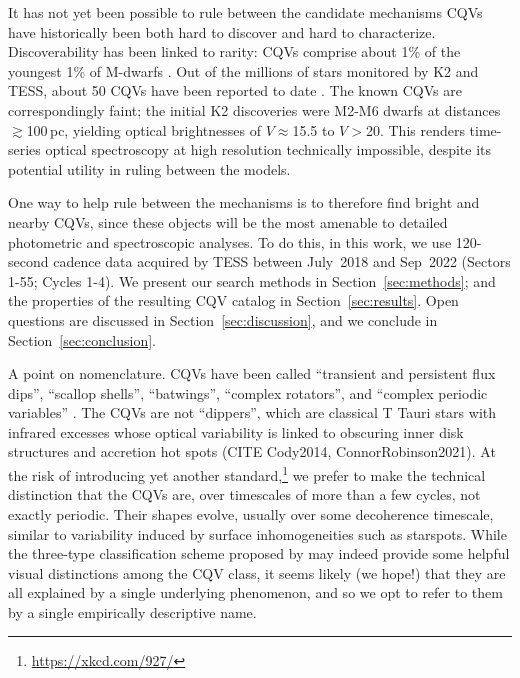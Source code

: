 \documentclass[11pt,twocolumn,tighten]{aastex63}
\begin{document}
It has not yet been possible to rule between the candidate mechanisms
CQVs have historically been both hard to discover and hard
to characterize.   Discoverability has been linked to rarity: 
CQVs comprise about 1\% of the youngest 1\% of M-dwarfs
\citep{2018AJ....155..196R}.  Out of the millions of stars monitored
by K2 and TESS, about 50 CQVs have been reported to date
\citep{2017AJ....153..152S,2018AJ....155...63S,2019ApJ...876..127Z,2022AJ....163..144G,2023ApJ...945..114P}.
The known CQVs are correspondingly faint; the initial K2 discoveries
\citep{2017AJ....153..152S} were M2-M6 dwarfs at distances
$\gtrsim$100\,pc, yielding optical brightnesses of $V$$\approx$15.5 to
$V$$>$20.  This renders time-series optical spectroscopy at high
resolution technically impossible, despite its potential utility in
ruling between the models.

One way to help rule between the mechanisms is to therefore find
bright and nearby CQVs, since these objects will be the most amenable
to detailed photometric and spectroscopic analyses.  To do this, in
this work, we use 120-second cadence data acquired by TESS between July~2018 and Sep~2022 (Sectors
1-55; Cycles 1-4).  We present our search methods in
Section~\ref{sec:methods}; and the properties of the resulting CQV
catalog in Section~\ref{sec:results}.  Open questions are discussed in
Section~\ref{sec:discussion}, and we conclude in
Section~\ref{sec:conclusion}.

A point on nomenclature.  CQVs have been called ``transient and
persistent flux dips'', ``scallop shells'', ``batwings'',
\citep{2017AJ....153..152S,2018AJ....155...63S} ``complex rotators'',
\citep{2019ApJ...876..127Z,2022AJ....163..144G,2023ApJ...945..114P}
and ``complex periodic variables'' \citep{2023MNRAS.518.2921K}.  The
CQVs are not ``dippers'', which are classical T Tauri stars with
infrared excesses whose optical variability is linked to obscuring
inner disk structures and accretion hot spots (CITE Cody2014,
ConnorRobinson2021).  At the risk of introducing yet another standard,\footnote{\url{https://xkcd.com/927/}}
we prefer to make the
technical distinction that the CQVs are, over timescales of more than
a few cycles, not exactly periodic.  Their shapes evolve, usually over
some decoherence timescale, similar to variability induced by surface
inhomogeneities such as starspots.  While the three-type
classification scheme proposed by \citet{2017AJ....153..152S} may
indeed provide some helpful visual distinctions among the CQV class,
it seems likely (we hope!) that they are all explained by a single
underlying phenomenon, and so we opt to refer to them by a single
empirically descriptive name.
\end{document}
